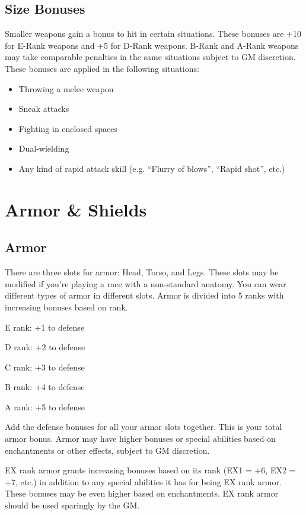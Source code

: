 \begin{multicols}{2}
\subsection{Size Bonuses}
Smaller weapons gain a bonus to hit in certain situations. These bonuses are +10 for E-Rank weapons and +5 for D-Rank weapons. B-Rank and A-Rank weapons may take comparable penalties in the same situations subject to GM discretion. These bonuses are applied in the following situations:
\begin{itemize}
\item Throwing a melee weapon
\item Sneak attacks
\item Fighting in enclosed spaces
\item Dual-wielding
\item Any kind of rapid attack skill (e.g. “Flurry of blows”, “Rapid shot”, etc.)
\end{itemize}


\section{Armor \& Shields}

\subsection{Armor}
There are three slots for armor: Head, Torso, and Legs. These slots may be modified if you're playing a race with a non-standard anatomy. You can wear different types of armor in different slots. Armor is divided into 5 ranks with increasing bonuses based on rank.
\begin{wldescription}
\item [E rank:] +1 to defense
\item [D rank:] +2 to defense
\item [C rank:] +3 to defense
\item [B rank:] +4 to defense
\item [A rank:] +5 to defense
\end{wldescription}
Add the defense bonuses for all your armor slots together. This is your total armor bonus.
Armor may have higher bonuses or special abilities based on enchantments or other effects, subject to GM discretion.

EX rank armor grants increasing bonuses based on its rank (EX1 = +6, EX2 = +7, etc.) in addition to any special abilities it has for being EX rank armor. These bonuses may be even higher based on enchantments. EX rank armor should be used sparingly by the GM.



\end{multicols}
